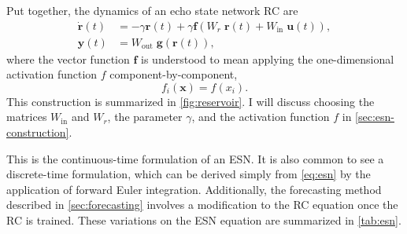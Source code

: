 Put together, the dynamics of an echo state network RC are
\begin{align}
  \label{eq:esn}
  \dot{\bm{r}}(t) &= - \gamma \bm{r}(t) + \gamma \bm{f}\left( W_r\;\bm{r}(t) + W_\text{in}\;\bm{u}(t) \right), \\
  \bm{y}(t) &= W_\text{out}\;\bm{g}\left(\bm{r}(t)\right), \nonumber
\end{align}
where the vector function $\bm{f}$ is understood to mean applying the
one-dimensional activation function $f$ component-by-component,
\begin{equation}
  f_i(\bm{x}) = f(x_i).
\end{equation}
This
construction is summarized in \cref{fig:reservoir}. I will discuss
choosing the matrices $W_\text{in}$ and $W_r$, the parameter $\gamma$,
and the activation function $f$ in \cref{sec:esn-construction}.

This is the continuous-time formulation of an ESN. It is also common
to see a discrete-time formulation, which can be derived simply from
\cref{eq:esn} by the application of forward Euler
integration. Additionally, the forecasting method described in
\cref{sec:forecasting} involves a modification to the RC equation once
the RC is trained. These variations on the ESN equation are summarized
in \cref{tab:esn}.

